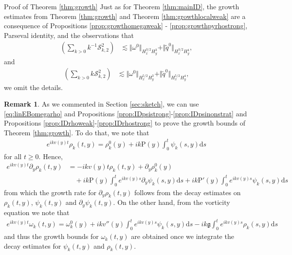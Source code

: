 \documentclass[11pt,reqno]{amsproc}
\makeatletter
\renewcommand\subsection{\@startsection{subsection}{2}%
\normalparindent{.5\linespacing\@plus.7\linespacing}{-.5em}
{\normalfont\bfseries}}
\theoremstyle{definition}
\newtheorem{remark}[proposition]{Remark}
\numberwithin{equation}{section}
\newcommand{\cS}{{\mathcal S}}
\renewcommand{\d}{\mathrm{d}}
\newcommand{\g}{{\mathfrak{g}}}
\makeatother
\begin{document}
\subsection{Proof of Theorem \ref{thm:growth}}
Just as for Theorem \ref{thm:mainID}, the growth estimates from Theorem \ref{thm:growth} and Theorem \ref{thm:growthlocalweak} are a consequence of Propositions \ref{prop:growthomegaweak} - \ref{prop:growthpyrhostrong}, Parseval identity, and the observations that
\begin{align*}
\left( \sum_{k>0} k^{-1}\cS_{k,2}^2 \right) &\lesssim\Vert \omega^0 \Vert_{H^{3/2}_x H^3_y} + \Vert \widetilde q^0 \Vert_{H^{3/2}_x H^4_y}, 
\end{align*}
and
\begin{align*}
\left( \sum_{k>0} k\cS_{k,2}^2 \right) &\lesssim\Vert \omega^0 \Vert_{H^{5/2}_x H^3_y} + \Vert \widetilde q^0 \Vert_{H^{5/2}_x H^4_y}, 
\end{align*}
we omit the details.

\begin{remark}\label{rmk:growthlineq}
As we commented in Section \ref{sec:sketch}, we can use \eqref{eq:linEBomegarho} and Propositions \ref{prop:IDpsistrong}-\ref{prop:IDpsinonstrat} and Propositions \ref{prop:IDrhoweak}-\ref{prop:IDrhostrong} to prove the growth bounds of Theorem \ref{thm:growth}. To do that, we note that 
\begin{align*}
e^{ikv(y)t}\rho_k(t,y) = \rho_k^0(y) + ik\mathrm{P}(y)\int_{0}^t\psi_k(s,y) \d s
\end{align*}
for all $t\geq 0$. Hence,
\begin{align*}
e^{ikv(y)t}\partial_y\rho_k(t,y) &= -ikv(y)t\rho_k(t,y) + \partial_y\rho_k^0(y) \\
&\quad + ik\mathrm{P}(y)\int_0^te^{ikv(y)s} \partial_y\psi_k(s,y) \d s + ik\mathrm{P}'(y)\int_0^t e^{ikv(y)s} \psi_k(s,y) \d s
\end{align*}
from which the growth rate for $\partial_y\rho_k(t,y)$ follows from the decay estimates on $\rho_k(t,y)$, $\psi_k(t,y)$ and $\partial_y\psi_k(t,y)$. On the other hand, from the vorticity equation we note that
\begin{align*}
e^{ikv(y)t}\omega_k(t,y) = \omega_k^0(y) +ikv''(y) \int_{0}^t e^{ikv(y)s}\psi_k(s,y) \d s - ik\g \int_0^t e^{ikv(y)s}\rho_k(s,y) \d s
\end{align*}
and thus the growth bounds for $\omega_k(t,y)$ are obtained once we integrate the decay estimates for $\psi_k(t,y)$ and $\rho_k(t,y)$.
\end{remark}
\end{document}
